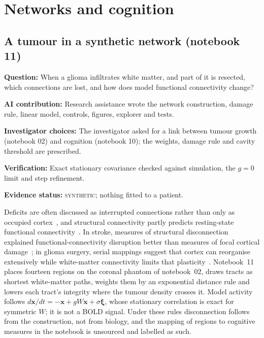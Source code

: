 \documentclass[11pt,a4paper]{article}
\newcommand{\aicontribution}[5]{\par\nobreak\smallskip\noindent
\begin{minipage}{\linewidth}\small
\noindent\textbf{Question:} #1\par
\noindent\textbf{AI contribution:} #2\par
\noindent\textbf{Investigator choices:} #3\par
\noindent\textbf{Verification:} #4\par
\noindent\textbf{Evidence status:} #5\par\end{minipage}\par\smallskip}
\newcommand{\evidence}[1]{\textsc{#1}}
\begin{document}
\section{Networks and cognition}
\label{sec:networks}

\subsection{A tumour in a synthetic network (notebook 11)}
\label{sec:network}

\aicontribution
{When a glioma infiltrates white matter, and part of it is resected, which connections are lost, and how does model functional connectivity change?}
{Research assistance wrote the network construction, damage rule, linear model, controls, figures, explorer and tests.}
{The investigator asked for a link between tumour growth (notebook 02) and cognition (notebook 10); the weights, damage rule and cavity threshold are prescribed.}
{Exact stationary covariance checked against simulation, the $g=0$ limit and step refinement.}
{\evidence{synthetic}; nothing fitted to a patient.}

Deficits are often discussed as interrupted connections rather than only as
occupied cortex~\cite{catani2005}, and structural connectivity partly predicts
resting-state functional connectivity~\cite{honey2009}. In stroke, measures of
structural disconnection explained functional-connectivity disruption better
than measures of focal cortical damage~\cite{griffis2019}; in glioma surgery,
serial mappings suggest that cortex can reorganise extensively while
white-matter connectivity limits that plasticity~\cite{duffau2014}. Notebook~11 places
fourteen regions on the coronal phantom of notebook~02, draws tracts as
shortest white-matter paths, weights them by an exponential distance rule and
lowers each tract's integrity where the tumour density crosses it. Model
activity follows $d\mathbf x/dt=-\mathbf x+gW\mathbf x+\sigma\boldsymbol\xi$,
whose stationary correlation is exact for symmetric $W$; it is not a BOLD
signal.
Under these rules disconnection follows from the construction, not from
biology, and the mapping of regions to cognitive measures in the notebook is
unsourced and labelled as such.
\end{document}
